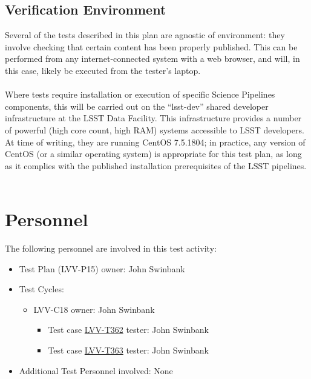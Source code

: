 \documentclass[DM,lsstdraft,STR,toc]{lsstdoc}
\begin{document}
\subsection{Verification Environment}
\label{sect:hwconf}
  Several of the tests described in this plan are agnostic of environment:
they involve checking that certain content has been properly published.
This can be performed from any internet-connected system with a web
browser, and will, in this case, likely be executed from the tester's
laptop.\\
~\\
Where tests require installation or execution of specific Science
Pipelines components, this will be carried out on the ``lsst-dev''
shared developer infrastructure at the LSST Data Facility. This
infrastructure provides a number of powerful (high core count, high RAM)
systems accessible to LSST developers. At time of writing, they are
running CentOS 7.5.1804; in practice, any version of CentOS (or a
similar operating system) is appropriate for this test plan, as long as
it complies with the published installation prerequisites of the LSST
pipelines.\\
~\\





\section{Personnel}
\label{sect:personnel}

The following personnel are involved in this test activity:

\begin{itemize}
\item Test Plan (LVV-P15) owner: John Swinbank
\item Test Cycles:
\begin{itemize}
  \item LVV-C18 owner: 
    John Swinbank
  \begin{itemize}
    \item Test case \href{https://jira.lsstcorp.org/secure/Tests.jspa#/testCase/LVV-T362}{LVV-T362} tester: John Swinbank
    \item Test case \href{https://jira.lsstcorp.org/secure/Tests.jspa#/testCase/LVV-T363}{LVV-T363} tester: John Swinbank
  \end{itemize}
\end{itemize}
\item Additional Test Personnel involved: None
\end{itemize}
\end{document}
